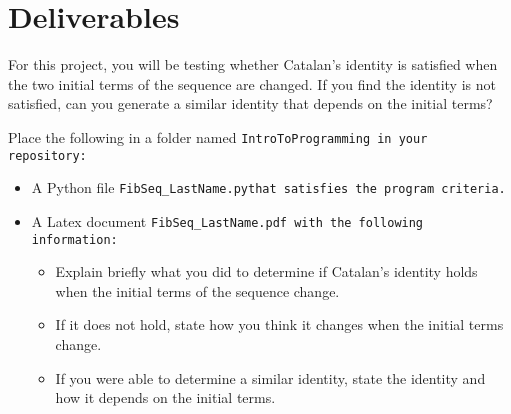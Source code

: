 \documentclass{article}
\newcommand\foldername{\tt{IntroToProgramming} }
\newcommand\filename{\tt{FibSeq\_LastName.py}\;\;}
\begin{document}
\section*{Deliverables}
	For this project, you will be testing whether Catalan's identity is satisfied when the two initial terms of the sequence are changed.  If you find the identity is not satisfied, can you generate a similar identity that depends on the initial terms?
	
	Place the following in a folder named \foldername in your repository:
	\begin{itemize}
		\item A Python file \filename  that satisfies the program criteria.
		\item A Latex document \tt{FibSeq\_LastName.pdf} with the following information:
		\begin{itemize}
			\item Explain briefly what you did to determine if Catalan's identity holds when the initial terms of the sequence change.
			\item If it does not hold, state how you think it changes when the initial terms change.
			\item If you were able to determine a similar identity, state the identity and how it depends on the initial terms.
		\end{itemize}
	\end{itemize}

	
\end{document}
